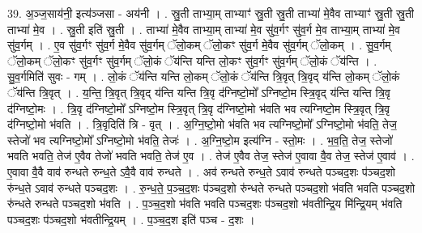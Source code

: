 \documentclass[17pt]{extarticle}
\begin{document}
39. अ॒ञ्ज॒साय॑नी॒ इत्य॑ञ्जसा - अय॑नी । . स्रु॒ती ताभ्या॒म् ताभ्याꣳ॑ स्रु॒ती स्रु॒ती ताभ्या॑ मे॒वैव ताभ्याꣳ॑ स्रु॒ती स्रु॒ती ताभ्या॑ मे॒व । . स्रु॒ती इति॑ स्रु॒ती । . ताभ्या॑ मे॒वैव ताभ्या॒म् ताभ्या॑ मे॒व सु॑व॒र्गꣳ सु॑व॒र्ग मे॒व ताभ्या॒म् ताभ्या॑ मे॒व सु॑व॒र्गम् । . ए॒व सु॑व॒र्गꣳ सु॑व॒र्ग मे॒वैव सु॑व॒र्गम् ॅलो॒कम् ॅलो॒कꣳ सु॑व॒र्ग मे॒वैव सु॑व॒र्गम् ॅलो॒कम् । . सु॒व॒र्गम् ॅलो॒कम् ॅलो॒कꣳ सु॑व॒र्गꣳ सु॑व॒र्गम् ॅलो॒कं ॅय॑न्ति यन्ति लो॒कꣳ सु॑व॒र्गꣳ सु॑व॒र्गम् ॅलो॒कं ॅय॑न्ति । . सु॒व॒र्गमिति॑ सुवः - गम् । . लो॒कं ॅय॑न्ति यन्ति लो॒कम् ॅलो॒कं ॅय॑न्ति त्रि॒वृत् त्रि॒वृद् य॑न्ति लो॒कम् ॅलो॒कं ॅय॑न्ति त्रि॒वृत् । . य॒न्ति॒ त्रि॒वृत् त्रि॒वृद् य॑न्ति यन्ति त्रि॒वृ द॑ग्निष्टो॒मो᳚ ऽग्निष्टो॒म स्त्रि॒वृद् य॑न्ति यन्ति त्रि॒वृ द॑ग्निष्टो॒मः । . त्रि॒वृ द॑ग्निष्टो॒मो᳚ ऽग्निष्टो॒म स्त्रि॒वृत् त्रि॒वृ द॑ग्निष्टो॒मो भ॑वति भव त्यग्निष्टो॒म स्त्रि॒वृत् त्रि॒वृ द॑ग्निष्टो॒मो भ॑वति । . त्रि॒वृदिति॑ त्रि - वृत् । . अ॒ग्नि॒ष्टो॒मो भ॑वति भव त्यग्निष्टो॒मो᳚ ऽग्निष्टो॒मो भ॑वति॒ तेज॒ स्तेजो॑ भव त्यग्निष्टो॒मो᳚ ऽग्निष्टो॒मो भ॑वति॒ तेजः॑ । . अ॒ग्नि॒ष्टो॒म इत्य॑ग्नि - स्तो॒मः । . भ॒व॒ति॒ तेज॒ स्तेजो॑ भवति भवति॒ तेज॑ ए॒वैव तेजो॑ भवति भवति॒ तेज॑ ए॒व । . तेज॑ ए॒वैव तेज॒ स्तेज॑ ए॒वावा वै॒व तेज॒ स्तेज॑ ए॒वाव॑ । . ए॒वावा वै॒वै वाव॑ रुन्धते रुन्ध॒ते ऽवै॒वै वाव॑ रुन्धते । . अव॑ रुन्धते रुन्ध॒ते ऽवाव॑ रुन्धते पञ्चद॒शः प॑ञ्चद॒शो रु॑न्ध॒ते ऽवाव॑ रुन्धते पञ्चद॒शः । . रु॒न्ध॒ते॒ प॒ञ्च॒द॒शः प॑ञ्चद॒शो रु॑न्धते रुन्धते पञ्चद॒शो भ॑वति भवति पञ्चद॒शो रु॑न्धते रुन्धते पञ्चद॒शो भ॑वति । . प॒ञ्च॒द॒शो भ॑वति भवति पञ्चद॒शः प॑ञ्चद॒शो भ॑वतीन्द्रि॒य मि॑न्द्रि॒यम् भ॑वति पञ्चद॒शः प॑ञ्चद॒शो भ॑वतीन्द्रि॒यम् । . प॒ञ्च॒द॒श इति॑ पञ्च - द॒शः । \newline
\end{document}
